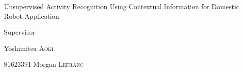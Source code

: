 \begin{center}
\vspace*{20pt}

\vspace{100pt}

\vspace{10pt}

\Large{Unsupervised Activity Recognition Using Contextual Information for Domestic Robot Application}
\vspace{180pt}

\vspace{40pt}

\large {Supervisor}

\large {Yoshimitsu \textsc{Aoki}}

\vspace{30pt}

\large {81623391}
\large {Morgan \textsc{Lefranc}}

\end{center}